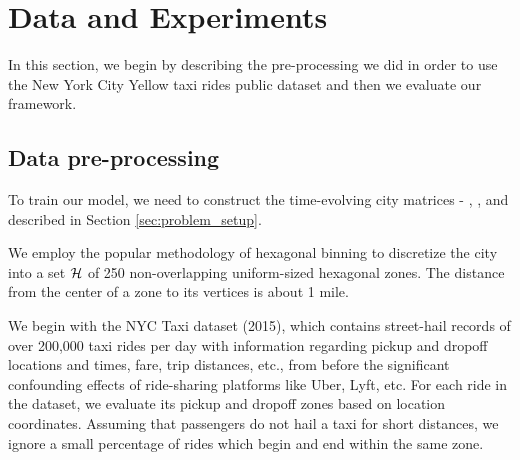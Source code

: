 \section{Data and Experiments}
\label{sec:data_and_experiments}

In this section, we begin by describing the
    pre-processing we did in order to use the New York City 
    Yellow taxi rides public dataset and then we
    evaluate our framework. 

\subsection{Data pre-processing}

To train our model, we need to construct the time-evolving city
    matrices - {\demandmatrix}, {\rewardmatrix}, and {\traveltimematrix} 
    described in Section \ref{sec:problem_setup}.

We employ the popular methodology of hexagonal binning to discretize the city 
    into a set ${{\mathcal{H}}}$
    of 250 non-overlapping uniform-sized hexagonal zones. 
The distance from the center of a zone to its vertices is about 1 mile.

We begin with the NYC Taxi dataset (2015), which contains
    street-hail records of over 200,000 taxi rides per day with information
    regarding pickup and dropoff locations and times, fare, trip distances, etc.,
    from before the significant confounding effects of ride-sharing
    platforms like Uber, Lyft, etc. 
For each ride in the dataset, we evaluate its pickup and dropoff zones
    based on location coordinates. 
Assuming that passengers do not
    hail a taxi for short distances, we ignore a small percentage of rides
    which begin and end within the same zone.

